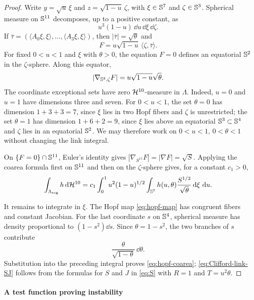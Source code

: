 \begin{proof}
Write $y=\sqrt u\,\xi$ and $z=\sqrt{1-u}\,\zeta$, with
$\xi\in\mathbb S^7$ and $\zeta\in\mathbb S^3$.  Spherical measure on $\mathbb S^{11}$
decomposes, up to a positive constant, as
\[
 u^3(1-u)\,\dd u\,\dd\xi\,\dd\zeta.
\]
If
$\bar\tau=(\langle A_0\xi,\xi\rangle,\ldots,
\langle A_3\xi,\xi\rangle)$, then
$|\bar\tau|=\sqrt\theta$ and
\[
 F=u\sqrt{1-u}\,\langle\zeta,\bar\tau\rangle.
\]
For fixed $0<u<1$ and $\xi$ with $\theta>0$, the equation $F=0$
defines an equatorial $\mathbb S^2$ in the $\zeta$-sphere.  Along this equator,
\begin{equation}\label{eq:z-coarea}
 |\nabla_{\mathbb S^3,\zeta}F|=u\sqrt{1-u}\sqrt\theta.
\end{equation}
The coordinate exceptional sets have zero $\mathcal H^{10}$-measure in
$\Lambda$. Indeed, $u=0$ and $u=1$ have dimensions three and seven.
For $0<u<1$, the set $\theta=0$ has dimension $1+3+3=7$, since
$\xi$ lies in two Hopf fibers and $\zeta$ is unrestricted; the set
$\theta=1$ has dimension $1+6+2=9$, since $\xi$ lies above an
equatorial $\mathbb S^3\subset\mathbb S^4$ and $\zeta$ lies in an equatorial
$\mathbb S^2$. We may therefore work on $0<u<1$, $0<\theta<1$ without
changing the link integral.

On $\{F=0\}\cap\mathbb S^{11}$, Euler's identity gives
$|\nabla_{S^{11}}F|=|\nabla F|=\sqrt S$.
Applying the coarea formula first on $\mathbb S^{11}$ and then on the
$\zeta$-sphere gives, for a constant $c_1>0$,
\[
 \int_{\Lambda_{\mathrm{reg}}}h\,\mathrm d\mathcal H^{10}
 =c_1\int_0^1u^2(1-u)^{1/2}
       \int_{\mathbb S^7}h(u,\theta)\frac{S^{1/2}}{\sqrt\theta}
       \,\mathrm d\xi\,\,\mathrm d u.
\]

It remains to integrate in $\xi$.  The Hopf map
\eqref{eq:hopf-map} has congruent fibers and constant Jacobian.
For the last coordinate $s$ on $\mathbb S^4$, spherical measure has density
proportional to $(1-s^2)\dd s$.  Since $\theta=1-s^2$, the two
branches of $s$ contribute
\[
 \frac{\theta}{\sqrt{1-\theta}}\,\dd\theta.
\]
Substitution into the preceding integral proves
\eqref{eq:hopf-coarea}; \eqref{eq:Clifford-link-SJ} follows from
the formulas for $S$ and $J$ in \eqref{eq:S} with
$R=1$ and $T=u^2\theta$.
\end{proof}

\paragraph*{A test function proving instability}

